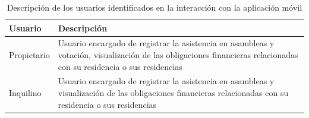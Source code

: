 \begin{footnotesize}
\begin{spacing}{1}
    \begin{center}
        \renewcommand*{\arraystretch}{1.4}
        \begin{longtable}{|p{}|p{}|}\caption{Descripción de los usuarios identificados en la interacción con la aplicación móvil}\label{tab:table_usuarios_movil_description} \\
        \hline
        \textbf{Usuario} & \textbf{Descripción}                                                                                                                                                 \\
        \hline
        Propietario      & Usuario encargado de registrar la asistencia en asambleas y votación, visualización de las obligaciones financieras relacionadas con su residencia o sus residencias \\
        \hline
        Inquilino        & Usuario encargado de registrar la asistencia en asambleas y visualización de las obligaciones financieras relacionadas con su residencia o sus residencias           \\
        \hline
        \end{longtable}
    \end{center}
\end{spacing}
\end{footnotesize}


